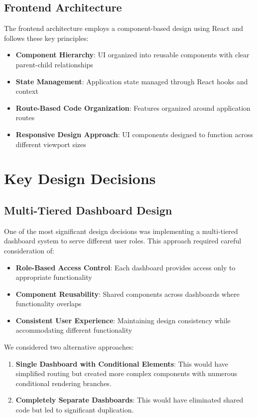 \subsection{Frontend Architecture}

The frontend architecture employs a component-based design using React and follows these
key principles:

\begin{itemize}
    \item \textbf{Component Hierarchy}: UI organized into reusable components with clear
     parent-child relationships
    \item \textbf{State Management}: Application state managed through React hooks and 
    context
    \item \textbf{Route-Based Code Organization}: Features organized around application 
    routes
    \item \textbf{Responsive Design Approach}: UI components designed to function across 
    different viewport sizes
\end{itemize}

\section{Key Design Decisions}

\subsection{Multi-Tiered Dashboard Design}

One of the most significant design decisions was implementing a multi-tiered dashboard 
system to serve different user roles. This approach required careful consideration of:

\begin{itemize}
    \item \textbf{Role-Based Access Control}: Each dashboard provides access only to 
    appropriate functionality
    \item \textbf{Component Reusability}: Shared components across dashboards where 
    functionality overlaps
    \item \textbf{Consistent User Experience}: Maintaining design consistency while 
    accommodating different functionality
\end{itemize}

We considered two alternative approaches:

\begin{enumerate}
    \item \textbf{Single Dashboard with Conditional Elements}: This would have simplified 
    routing but created more complex components with numerous conditional rendering branches.
    \item \textbf{Completely Separate Dashboards}: This would have eliminated shared code 
    but led to significant duplication.
\end{enumerate}

